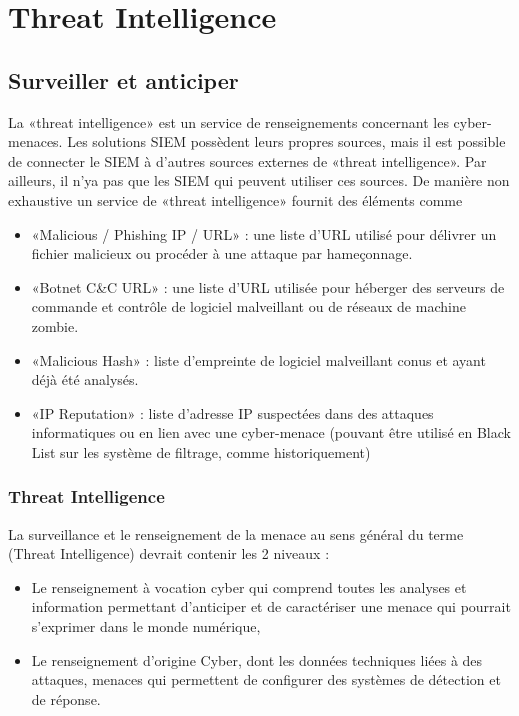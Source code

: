 %

\section{Threat Intelligence}

\subsection{Surveiller et anticiper}

La «threat intelligence» est un service de renseignements concernant les cyber-menaces. Les solutions SIEM possèdent leurs propres sources, mais il est possible de connecter le SIEM à d’autres sources externes de «threat intelligence». Par ailleurs, il n'ya pas que les SIEM qui peuvent utiliser ces sources. De manière non exhaustive un service de «threat intelligence»  fournit des éléments comme 
\begin{itemize}
  \item «Malicious / Phishing IP / URL» : une liste d’URL utilisé pour  délivrer un fichier malicieux ou procéder à une attaque par hameçonnage.
  \item 	«Botnet C&C URL» : une liste d’URL utilisée pour héberger des serveurs de commande et contrôle de logiciel malveillant ou de réseaux de machine zombie.
  \item «Malicious Hash» : liste d’empreinte de logiciel malveillant conus et ayant déjà été analysés.
  \item  «IP Reputation» : liste d’adresse IP suspectées dans des attaques informatiques ou en lien avec une cyber-menace (pouvant être utilisé en Black List sur les système de filtrage, comme historiquement)
\end{itemize}



\begin{frame}
\frametitle<presentation>{Threat Intelligence}
La surveillance et le renseignement de la menace au sens général du terme (Threat Intelligence) devrait contenir les 2 niveaux :

\begin{itemize}
  \item Le renseignement à vocation cyber qui comprend toutes les analyses et information permettant d'anticiper et de caractériser une menace qui pourrait s'exprimer dans le monde numérique,
  \item Le renseignement d'origine Cyber, dont les données techniques liées à des attaques, menaces qui permettent de configurer des systèmes de détection et de réponse.
\end{itemize}
\end{frame}

